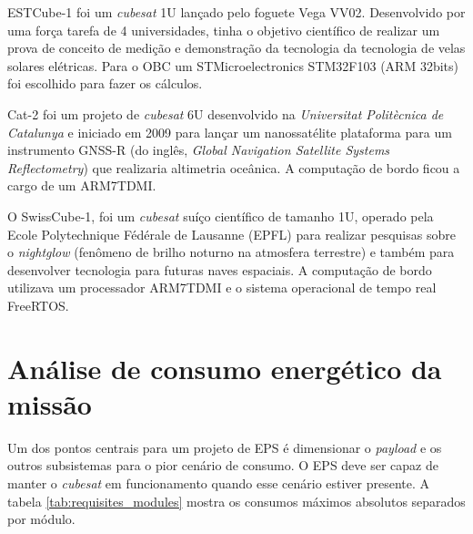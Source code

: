 ESTCube-1 \cite{estcube1_ref} foi um \textit{cubesat} 1U lançado pelo foguete Vega VV02. Desenvolvido por uma força tarefa de 4 universidades, tinha o objetivo científico de realizar um prova de conceito de medição e demonstração da tecnologia da tecnologia de velas solares elétricas. Para o OBC um STMicroelectronics STM32F103 (ARM 32bits) foi escolhido para fazer os cálculos.

Cat-2 \cite{cat2_ref} foi um projeto de \textit{cubesat} 6U desenvolvido na \textit{Universitat Politècnica de Catalunya} e iniciado em 2009 para lançar um nanossatélite plataforma para um instrumento GNSS-R (do inglês, \textit{Global Navigation Satellite Systems Reflectometry}) que realizaria altimetria oceânica. A computação de bordo ficou a cargo de um ARM7TDMI.  

O SwissCube-1, \cite{swisscube_ref} foi um \textit{cubesat} suíço científico de tamanho 1U, operado pela Ecole Polytechnique Fédérale de Lausanne (EPFL) para realizar pesquisas sobre o \textit{nightglow} (fenômeno de brilho   noturno na atmosfera terrestre) e também para desenvolver tecnologia para futuras naves espaciais. A  computação  de  bordo utilizava um processador ARM7TDMI e o sistema operacional de tempo real FreeRTOS.



\section{Análise de consumo energético da missão}

Um dos pontos centrais para um projeto de EPS é dimensionar o \textit{payload} e os outros subsistemas para o pior cenário de consumo. O EPS deve ser capaz de manter o \textit{cubesat} em funcionamento quando esse cenário estiver presente. A tabela \ref{tab:requisites_modules} mostra os consumos máximos absolutos separados por módulo.

